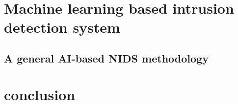 %





\section{Machine learning based intrusion detection system}
\subsection{A general AI-based NIDS methodology}






\section{conclusion}





